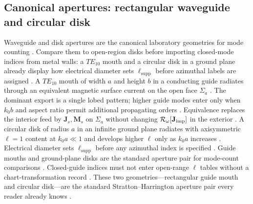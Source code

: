 \subsection{Canonical apertures: rectangular waveguide and circular disk}
\label{sec:ch42.signature-apertures}
Waveguide and disk apertures are the canonical laboratory geometries for mode counting \cite{stratton1941}. Compare them to open-region disks before importing closed-mode indices from metal walls: a $TE_{10}$ mouth and a circular disk in a ground plane already display how electrical diameter sets $\ell_{\mathrm{supp}}$ before azimuthal labels are assigned \cite{jackson1999}.
A $TE_{10}$ mouth of width $a$ and height $b$ in a conducting guide radiates through an equivalent magnetic surface current on the open face $\Sigma_a$ \cite{collin2001}. The dominant export is a single lobed pattern; higher guide modes enter only when $k_0 b$ and aspect ratio permit additional propagating orders \cite{harrington2001}. Equivalence replaces the interior feed by $\mathbf{J}_s,\mathbf{M}_s$ on $\Sigma_a$ without changing $\mathcal{R}_\omega[\mathbf{J}_{\mathrm{imp}}]$ in the exterior \cite{stratton1941}.
A circular disk of radius $a$ in an infinite ground plane radiates with axisymmetric $\ell=1$ content at $k_0 a\ll 1$ and develops higher $\ell$ only as $k_0 a$ increases \cite{stratton1941}. Electrical diameter sets $\ell_{\mathrm{supp}}$ before any azimuthal index is specified \cite{harrington2001}.
Guide mouths and ground-plane disks are the standard aperture pair for mode-count comparisons \cite{stratton1941}. Closed-guide indices must not enter open-range $\ell$ tables without a chart-transformation record \cite{hansen1988}.
\medskip
 These two geometries---rectangular guide mouth and circular disk---are the standard Stratton--Harrington aperture pair every reader already knows \cite{stratton1941}.
